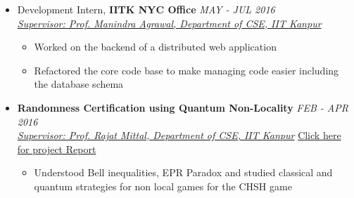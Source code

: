 \documentclass[letterpaper,11pt]{article}
\begin{document}
{\begin{itemize}
    \item Development Intern, \textbf{IITK NYC Office} \hfill \textit{MAY - JUL 2016}\\
        \textit{\href{http://www.cse.iitk.ac.in/users/manindra/}{Supervisor: Prof. Manindra Agrawal, Department of CSE, IIT Kanpur}}
        \vspace{-5pt}
        \begin{itemize}
            \item Worked on the backend of a distributed web application
                \vspace{-2pt}
            \item Refactored the core code base to make managing code easier including the database schema
                \vspace{-2pt}
        \end{itemize}
        \vspace{-5pt}
    \item \textbf{Randomness Certification using Quantum Non-Locality} \hfill \textit{FEB - APR 2016} \\
        \href{http://www.cse.iitk.ac.in/users/rmittal/}{\textit{Supervisor: Prof. Rajat Mittal, Department of CSE, IIT Kanpur}} \hfill \href{http://home.iitk.ac.in/~kunalkap/Final_Project_Report_CS682.pdf}{Click here for project Report}
        \vspace{-5pt}
        \begin{itemize}
            \item Understood Bell inequalities, EPR Paradox and studied classical and quantum strategies for non local games for the CHSH game
                \vspace{-2pt}

\end{itemize}
\end{itemize}}
\end{document}
